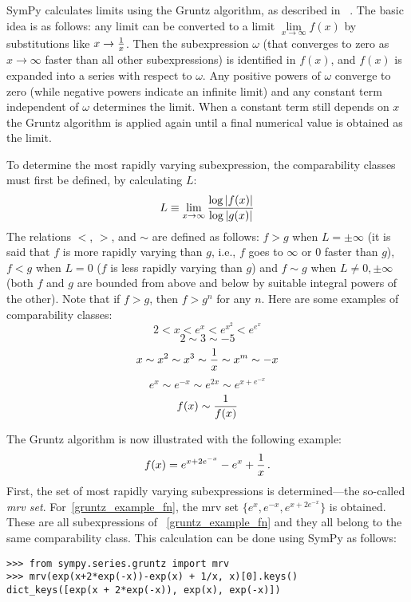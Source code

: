 SymPy calculates limits using the Gruntz algorithm, as described in%
~\cite{Gruntz1996limits}. The basic idea is as follows: any limit can be
converted to a limit $\lim\limits_{x\to\infty} f(x)$ by substitutions like
$x\to{1\over x}$. Then the subexpression $\omega$ (that converges
to zero as $x\to\infty$ faster than all other subexpressions) is identified in
$f(x)$, and $f(x)$ is expanded into a series with respect to $\omega$. Any
positive powers of $\omega$ converge to zero (while negative powers indicate
an infinite limit) and any constant term independent of
$\omega$ determines the limit. When a constant term still depends on
$x$ the Gruntz algorithm is applied again until a final numerical value
is obtained as the limit.

To determine the most rapidly varying subexpression, the comparability classes
must first be defined, by calculating $L$:
\begin{equation}
L\equiv \lim_{x\to\infty} {\log |f(x)| \over \log |g(x)|}
\end{equation}
The relations $<$, $>$, and $\sim$ are defined as follows: $f>g$ when
$L=\pm\infty$ (it is said that $f$ is more rapidly varying than $g$, i.e., $f$
goes to $\infty$ or $0$ faster than $g$), $f<g$ when $L=0$ ($f$ is less
rapidly varying than $g$) and $f\sim g$ when $L\neq 0,\pm\infty$ (both $f$ and
$g$ are bounded from above and below by suitable integral powers of the
other). Note that if $f > g$, then $f > g^n$ for any $n$. Here
are some examples of comparability classes:
\[2 < x < e^x < e^{x^2} < e^{e^x}\]
\[2\sim 3\sim -5\]
\[x\sim x^2\sim x^3\sim {1\over x}\sim x^m\sim -x\]
\[e^x\sim e^{-x}\sim e^{2x}\sim e^{x+e^{-x}}\]
\[f(x)\sim{1\over f(x)}\]

The Gruntz algorithm is now illustrated with the following example:
\begin{equation}
    \label{gruntz_example_fn}
f(x) = e^{x+2e^{-x}} - e^x + {1\over x} \,.
\end{equation}
First, the set of most rapidly varying subexpressions is determined---the
so-called \textit{mrv set}. For~\eqref{gruntz_example_fn}, the mrv set
$\{e^x, e^{-x}, e^{x+2e^{-x}}\}$ is obtained. These are all subexpressions of%
~\eqref{gruntz_example_fn} and they all belong to the same comparability
class. This calculation can be done using SymPy as follows:

\begin{verbatim}
>>> from sympy.series.gruntz import mrv
>>> mrv(exp(x+2*exp(-x))-exp(x) + 1/x, x)[0].keys()
dict_keys([exp(x + 2*exp(-x)), exp(x), exp(-x)])
\end{verbatim}


